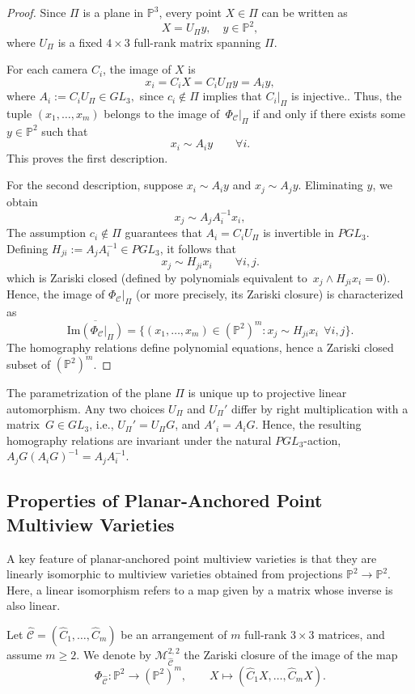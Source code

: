 \documentclass{article}
\newcommand{\PP}{\mathbb{P}}
\begin{document}
\begin{proof}
Since $\Pi$ is a plane in $\mathbb{P}^3$, every point $X \in \Pi$ can be written as
\[
X = U_\Pi y, \quad y \in \mathbb{P}^2,
\]
where $U_\Pi$ is a fixed $4 \times 3$ full-rank matrix spanning $\Pi$.  

For each camera $C_i$, the image of $X$ is
\[
x_i = C_i X = C_i U_\Pi y = A_i y,
\]
where $A_i := C_i U_\Pi \in GL_3,$  since \( c_i \notin \Pi \) implies that \( C_i|_\Pi \) is injective..  
Thus, the tuple $(x_1,\ldots,x_m)$ belongs to the image of~$\Phi_\mathcal{C}|_\Pi$ if and only if there exists some~$y \in \mathbb{P}^2$ such that
\[
x_i \sim A_i y \qquad \forall i.
\]
This proves the first description.

For the second description, suppose $x_i \sim A_i y$ and $x_j \sim A_j y$. Eliminating $y$, we obtain
\[
x_j \sim A_j A_i^{-1} x_i,
\]
The assumption $c_i \notin \Pi$ guarantees that $A_i = C_i U_\Pi$ is invertible in $PGL_3$.
Defining $H_{j i} := A_j A_i^{-1} \in PGL_3$, it follows that
\[
x_j \sim H_{j i} x_i \qquad \forall i,j.
\]
which is Zariski closed (defined by polynomials equivalent \mbox{to~$x_j\wedge H_{j i}x_i=0$).} Hence, the image of $\Phi_\mathcal{C}|_\Pi$ (or more precisely, its Zariski closure) is characterized as
\[
\overline{\mathrm{Im}(\Phi_\mathcal{C}|_\Pi)} 
= \{ (x_1,\ldots,x_m)\in(\PP^2)^m : x_j \sim H_{j i} x_i \ \ \forall i,j \}.
\]
The homography relations define polynomial equations, hence a Zariski closed subset of $(\mathbb{P}^2)^m$.
\end{proof}
The parametrization of the plane \( \Pi \) is unique up to projective linear automorphism. Any two choices \( U_\Pi \) and \( U_\Pi' \) differ by right multiplication with a matrix~\( G \in GL_3 \), i.e., \( U_\Pi' = U_\Pi G \), and \(A'_i=A_iG\). Hence, the resulting homography relations are invariant under the natural \( PGL_3 \)-action, \( A_j G (A_i G)^{-1} = A_j A_i^{-1} \).
\subsection{Properties of Planar-Anchored Point Multiview Varieties}
A key feature of planar-anchored point multiview varieties is that they are
linearly isomorphic to multiview varieties obtained from projections
$\PP^2 \to \PP^2$. Here, a linear isomorphism refers to a map given by a
matrix whose inverse is also linear.

Let $\widehat{\mathcal C}=(\widehat C_1,\ldots,\widehat C_m)$ be an
arrangement of $m$ full-rank $3\times3$ matrices, and assume $m\ge 2.$
We denote by $\mathcal M^{2,2}_{\widehat{\mathcal C}}$ the Zariski closure
of the image of the map
\[
\Phi_{\widehat{\mathcal C}}:\PP^2 \longrightarrow (\PP^2)^m,
\qquad
X \longmapsto (\widehat C_1 X,\ldots,\widehat C_m X).
\]
\end{document}
